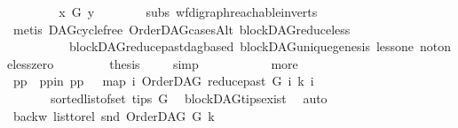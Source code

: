 \begin{isabellebody}
\ \ \ \ \isamarkupfalse%
\ \isamarkupfalse%
\ {\isachardoublequoteopen}{\isasymnot}\ x\ {\isasymrightarrow}\isactrlsup {\isacharplus}{\kern0pt}\isactrlbsub G\isactrlesub \ y{\isachardoublequoteclose}\isanewline
\ \ \ \ \ \ \isamarkupfalse%
\ subs\ wf{\isacharunderscore}{\kern0pt}digraph{\isachardot}{\kern0pt}reachable{}{\isacharunderscore}{\kern0pt}in{\isacharunderscore}{\kern0pt}verts\ {}\isanewline
\ \ \ \ \ \ \isamarkupfalse%
\ {\isacharparenleft}{\kern0pt}metis\ DAG{\isachardot}{\kern0pt}cycle{\isacharunderscore}{\kern0pt}free\ OrderDAG{\isacharunderscore}{\kern0pt}casesAlt\ blockDAG{\isachardot}{\kern0pt}reduce{\isacharunderscore}{\kern0pt}less\isanewline
\ \ \ \ \ \ \ \ \ \ blockDAG{\isachardot}{\kern0pt}reduce{\isacharunderscore}{\kern0pt}past{\isacharunderscore}{\kern0pt}dagbased\ blockDAG{\isachardot}{\kern0pt}unique{\isacharunderscore}{\kern0pt}genesis\ less{\isacharunderscore}{\kern0pt}one\ not{\isacharunderscore}{\kern0pt}one{\isacharunderscore}{\kern0pt}less{\isacharunderscore}{\kern0pt}zero{\isacharparenright}{\kern0pt}\ \isanewline
\ \ \ \ \isamarkupfalse%
\ \isamarkupfalse%
\ {\isacharquery}{\kern0pt}thesis\ \isamarkupfalse%
\ {}\ \isamarkupfalse%
\ simp\isanewline
\ \ \isamarkupfalse%
\ \ \isanewline
\ \ \ \ \isamarkupfalse%
\ more\isanewline
\ \ \ \ \isamarkupfalse%
\ pp\ \ pp{\isacharunderscore}{\kern0pt}in{\isacharcolon}{\kern0pt}\ {\isachardoublequoteopen}pp\ {\isacharequal}{\kern0pt}\ \ {\isacharparenleft}{\kern0pt}map\ {\isacharparenleft}{\kern0pt}{\isasymlambda}i{\isachardot}{\kern0pt}\ {\isacharparenleft}{\kern0pt}OrderDAG\ {\isacharparenleft}{\kern0pt}reduce{\isacharunderscore}{\kern0pt}past\ G\ i{\isacharparenright}{\kern0pt}\ k{\isacharcomma}{\kern0pt}\ i{\isacharparenright}{\kern0pt}{\isacharparenright}{\kern0pt}\isanewline
\ \ \ \ \ \ \ {\isacharparenleft}{\kern0pt}sorted{\isacharunderscore}{\kern0pt}list{\isacharunderscore}{\kern0pt}of{\isacharunderscore}{\kern0pt}set\ {\isacharparenleft}{\kern0pt}tips\ G{\isacharparenright}{\kern0pt}{\isacharparenright}{\kern0pt}{\isacharparenright}{\kern0pt}{\isachardoublequoteclose}\ \isamarkupfalse%
\ blockDAG{\isachardot}{\kern0pt}tips{\isacharunderscore}{\kern0pt}exist\ \isamarkupfalse%
\ auto\isanewline
\ \ \ \ \isamarkupfalse%
\ backw{\isacharcolon}{\kern0pt}\ {\isachardoublequoteopen}list{\isacharunderscore}{\kern0pt}to{\isacharunderscore}{\kern0pt}rel\ {\isacharparenleft}{\kern0pt}snd\ {\isacharparenleft}{\kern0pt}OrderDAG\ G\ k{\isacharparenright}{\kern0pt}{\isacharparenright}{\kern0pt}\ {\isacharequal}{\kern0pt}\ \isanewline

\end{isabellebody}
